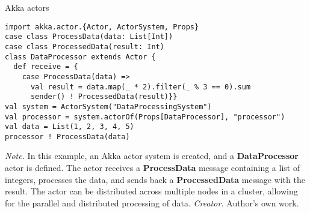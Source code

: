 \begin{table}[h!]
\caption{Akka actors}
\begin{lstlisting}
import akka.actor.{Actor, ActorSystem, Props}
case class ProcessData(data: List[Int])
case class ProcessedData(result: Int)
class DataProcessor extends Actor {
  def receive = {
    case ProcessData(data) =>
      val result = data.map(_ * 2).filter(_ % 3 == 0).sum
      sender() ! ProcessedData(result)}}
val system = ActorSystem("DataProcessingSystem")
val processor = system.actorOf(Props[DataProcessor], "processor")
val data = List(1, 2, 3, 4, 5)
processor ! ProcessData(data)
\end{lstlisting}
\small
\textit{Note.} In this example, an Akka actor system is created, and a \textbf{DataProcessor} actor is defined. The actor receives a \textbf{ProcessData} message containing a list of integers, processes the data, and sends back a \textbf{ProcessedData} message with the result. The actor can be distributed across multiple nodes in a cluster, allowing for the parallel and distributed processing of data.
\textit{Creator.} Author's own work.
\end{table}